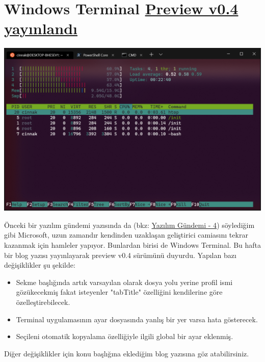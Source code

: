 \documentclass[11pt]{article}
\begin{document}
\section{Windows Terminal \href{https://devblogs.microsoft.com/commandline/windows-terminal-preview-v0-4-release/}{Preview v0.4 yayınlandı}}
\label{sec:org2168e67}
\begin{center}
\includegraphics[width=.9\linewidth]{gorseller/windows-terminal-v0_4.png}
\end{center}

Önceki bir yazılım gündemi yazısında da (bkz: \href{../04/yazilim-gundemi-04.pdf}{Yazılım Gündemi - 4}) söylediğim
gibi Microsoft, uzun zamandır kendinden uzaklaşan geliştirici camiasını tekrar
kazanmak için hamleler yapıyor. Bunlardan birisi de Windows Terminal. Bu hafta
bir blog yazısı yayınlayarak preview v0.4 sürümünü duyurdu. Yapılan bazı
değişiklikler şu şekilde:

\begin{itemize}
\item Sekme başlığında artık varsayılan olarak dosya yolu yerine profil ismi
gözükecekmiş fakat isteyenler "tabTitle" özelliğini kendilerine göre
özelleştirebilecek.
\item Terminal uygulamasının ayar dosyasında yanlış bir yer varsa hata gösterecek.
\item Seçileni otomatik kopyalama özelliğiyle ilgili global bir ayar eklenmiş.
\end{itemize}

Diğer değişiklikler için konu başlığına eklediğim blog yazısına göz
atabilirsiniz.
\end{document}
